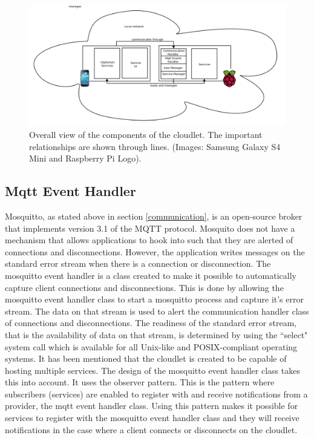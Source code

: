 \begin{figure}
\centering
\includegraphics[scale=0.4]{figures/systemoverview}
\caption{Overall view of the components of the cloudlet. The important relationships are shown through lines. (Images: Samsung Galaxy S4 Mini\cite{samsungphone} and Raspberry Pi Logo\cite{raspberrylogo}).}
\label{fig:objstruc}
\end{figure}


\subsection{Mqtt Event Handler}
Mosquitto, as stated above in section \ref{communication}, is an open-source broker that implements version 3.1 of the MQTT protocol. Mosquito does not have a mechanism that allows applications to hook into such that they are alerted of connections and disconnections. However, the application writes messages on the standard error stream when there is a connection or disconnection. The mosquitto event handler is a class created to make it possible to automatically capture client connections and disconnections. This is done by allowing the mosquitto event handler class to start a mosquitto process and capture it's error stream. The data on that stream is used to alert the communication handler class of connections and disconnections. The readiness of the standard error stream, that is the availability of data on that stream, is determined by using the ``select" system call which is available for all Unix-like and POSIX-compliant operating systems. It has been mentioned that the cloudlet is created to be capable of hosting multiple services. The design of the mosquitto event handler class takes this into account. It uses the observer pattern. This is the pattern where subscribers (services) are enabled to register with and receive notifications from a provider, the mqtt event handler class. Using this pattern makes it possible for services to register with the  mosquitto event handler class and they will receive notifications in the case where a client connects or disconnects on the cloudlet.


